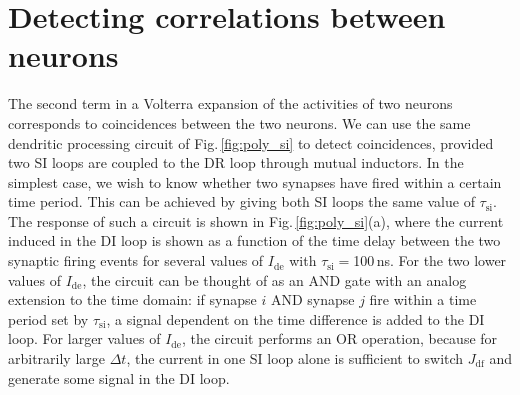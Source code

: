 \documentclass[twocolumn]{article}
\begin{document}
\section{\label{sec:correlations}Detecting correlations between neurons}
\begin{figure} 
\end{figure}
The second term in a Volterra expansion of the activities of two neurons corresponds to coincidences between the two neurons. We can use the same dendritic processing circuit of Fig.\,\ref{fig:poly_si} to detect coincidences, provided two SI loops are coupled to the DR loop through mutual inductors. In the simplest case, we wish to know whether two synapses have fired within a certain time period. This can be achieved by giving both SI loops the same value of $\tau_{\mathrm{si}}$. The response of such a circuit is shown in Fig.\,\ref{fig:poly_si}(a), where the current induced in the DI loop is shown as a function of the time delay between the two synaptic firing events for several values of $I_{\mathrm{de}}$ with $\tau_{\mathrm{si}} =$100\,ns. For the two lower values of $I_{\mathrm{de}}$, the circuit can be thought of as an AND gate with an analog extension to the time domain: if synapse $i$ AND synapse $j$ fire within a time period set by $\tau_{\mathrm{si}}$, a signal dependent on the time difference is added to the DI loop. For larger values of $I_{\mathrm{de}}$, the circuit performs an OR operation, because for arbitrarily large $\Delta t$, the current in one SI loop alone is sufficient to switch $J_{\mathrm{df}}$ and generate some signal in the DI loop.
\end{document}
